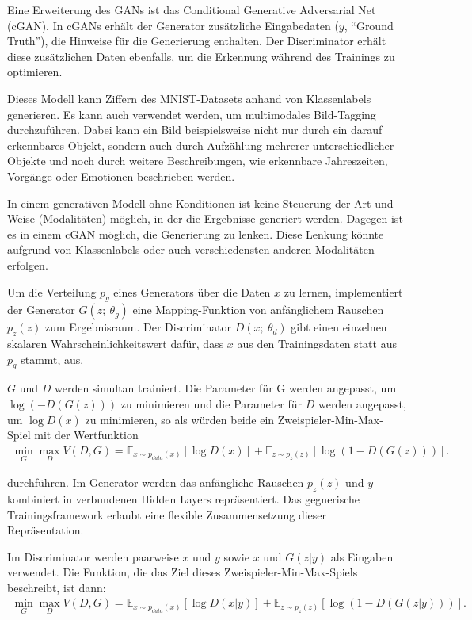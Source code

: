 Eine Erweiterung des GANs ist das Conditional Generative Adversarial Net (cGAN). In cGANs erhält der Generator zusätzliche Eingabedaten ($y$, ``Ground Truth''), die Hinweise für die Generierung enthalten. Der Discriminator erhält diese zusätzlichen Daten ebenfalls, um die Erkennung während des Trainings zu optimieren.

Dieses Modell kann Ziffern des MNIST-Datasets anhand von Klassenlabels generieren. Es kann auch verwendet werden, um multimodales Bild-Tagging durchzuführen. Dabei kann ein Bild beispielsweise nicht nur durch ein darauf erkennbares Objekt, sondern auch durch Aufzählung mehrerer unterschiedlicher Objekte und noch durch weitere Beschreibungen, wie erkennbare Jahreszeiten, Vorgänge oder Emotionen beschrieben werden.

In einem generativen Modell ohne Konditionen ist keine Steuerung der Art und Weise (Modalitäten) möglich, in der die Ergebnisse generiert werden. Dagegen ist es in einem cGAN möglich, die Generierung zu lenken. Diese Lenkung könnte aufgrund von Klassenlabels oder auch verschiedensten anderen Modalitäten erfolgen.

Um die Verteilung $p_g$ eines Generators über die Daten $x$ zu lernen, implementiert der Generator $G(z;\ \theta_g)$ eine Mapping-Funktion von anfänglichem Rauschen $p_z(z)$ zum Ergebnisraum. Der Discriminator $D(x;\ \theta_d)$ gibt einen einzelnen skalaren Wahrscheinlichkeitswert dafür, dass $x$ aus den Trainingsdaten statt aus $p_g$ stammt, aus.

$G$ und $D$ werden simultan trainiert. Die Parameter für G werden angepasst, um $\log(-D(G(z)))$ zu minimieren und die Parameter für $D$ werden angepasst, um $\log D(x)$ zu minimieren, so als würden beide ein Zweispieler-Min-Max-Spiel mit der Wertfunktion
\begin{align}
\min_{G}\max_{D} V(D,G) = \mathbb{E}_{x\sim p_{data}(x)}[\log{D(x)}]+\mathbb{E}_{z\sim p_z(z)}[\log(1-D(G(z)))].
\end{align}

durchführen. Im Generator werden das anfängliche Rauschen $p_z(z)$ und $y$ kombiniert in verbundenen Hidden Layers repräsentiert. Das gegnerische Trainingsframework erlaubt eine flexible Zusammensetzung dieser Repräsentation.

Im Discriminator werden paarweise $x$ und $y$ sowie $x$ und $G(z|y)$ als Eingaben verwendet. Die Funktion, die das Ziel dieses Zweispieler-Min-Max-Spiels beschreibt, ist dann:
\begin{align}
\min_{G}\max_{D} V(D,G) = \mathbb{E}_{x\sim p_{data}(x)}[\log{D(x|y)}]+\mathbb{E}_{z\sim p_z(z)}[\log(1-D(G(z|y)))].
\end{align}
\cite{mirza2014conditional}

